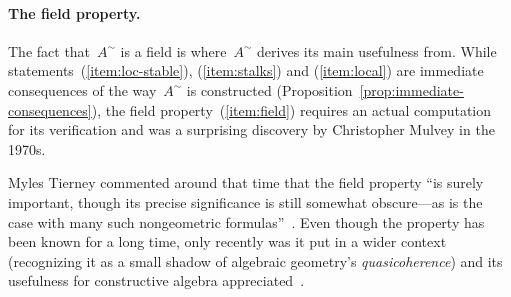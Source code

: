 \documentclass{ws-rv9x6}
\renewcommand{\_}{\mathpunct{.}}
\newcommand{\?}{\,{:}\,}
\begin{document}
\paragraph{The field property.}
The fact that~$A^\sim$ is a field is where~$A^\sim$ derives its main usefulness
from. While statements~(\ref{item:loc-stable}), (\ref{item:stalks}) and
(\ref{item:local}) are immediate consequences of the way~$A^\sim$ is
constructed (Proposition~\ref{prop:immediate-consequences}), the field property~(\ref{item:field})
requires an actual computation for its verification and was a surprising
discovery by Christopher Mulvey in the 1970s.

Myles Tierney commented around that time that the field property ``is surely important,
though its precise significance is still somewhat obscure---as is the case with
many such nongeometric formulas''~\cite[p.~209]{tierney:spectrum}. Even though
the property has been known for a long time, only recently was it put in a
wider context (recognizing it as a small shadow of algebraic geometry's
\emph{quasicoherence}) and its usefulness for constructive algebra
appreciated~\cite[Sections~3.3 and~11.4]{blechschmidt:phd}.
\end{document}
